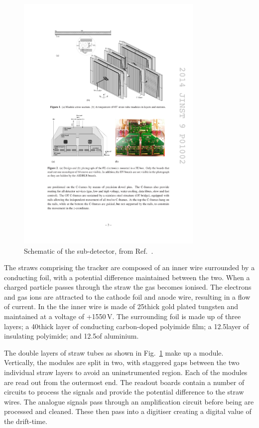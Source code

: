 \begin{figure}[!h]
    \centering
    \includegraphics[width=0.8\textwidth]{figs/Detector/ot_layout.pdf}
    \caption{Schematic of the \ot sub-detector, from Ref.~\cite{LHCb-DP-2013-003}.}
    \label{fig:Dec_ot_schematic}   
\end{figure}
 
The straws comprising the tracker are composed of an inner wire surrounded by a conducting foil, with a potential difference maintained between the two. When a charged particle passes through the straw the gas becomes ionised. The electrons and gas ions are attracted to the cathode foil and anode wire, resulting in a flow of current. In the \ot the inner wire is made of 25\mum thick gold plated tungsten and maintained at a voltage of +1550\,V. The surrounding foil is made up of three layers; a 40\mum thick layer of conducting carbon-doped polyimide film; a 12.5\mum layer of insulating polyimide; and 12.5\mum of aluminium. 

The double layers of straw tubes as shown in Fig.~\ref{fig:Dec_ot_schematic} make up a module. Vertically, the modules are split in two, with staggered gaps between the two individual straw layers to avoid an uninstrumented region. Each of the modules are read out from the outermost end. 
The readout boards contain a number of circuits to process the signals and provide the potential difference to the straw wires.
The analogue signals pass through an amplification circuit before being are processed and cleaned. These then pass into a digitiser creating a digital value of the drift-time.   

